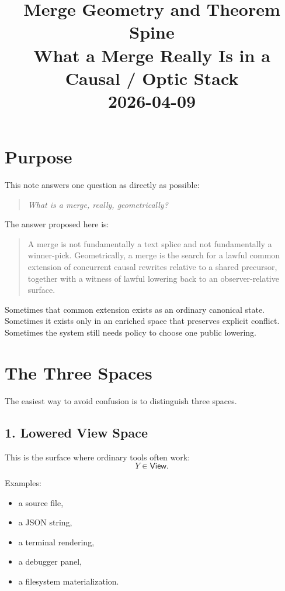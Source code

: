 \documentclass[11pt]{article}
\title{Merge Geometry and Theorem Spine\\[6pt]
\large What a Merge Really Is in a Causal / Optic Stack\\[3pt]
\normalsize 2026-04-09}
\author{}
\date{}
\newcommand{\View}{\ensuremath{\mathsf{View}}}
\theoremstyle{definition}
\begin{document}
\maketitle

\section{Purpose}

This note answers one question as directly as possible:

\begin{quote}
\emph{What is a merge, really, geometrically?}
\end{quote}

The answer proposed here is:

\begin{quote}
A merge is not fundamentally a text splice and not fundamentally a winner-pick.
Geometrically, a merge is the search for a lawful common extension of
concurrent causal rewrites relative to a shared precursor, together with a
witness of lawful lowering back to an observer-relative surface.
\end{quote}

Sometimes that common extension exists as an ordinary canonical state.
Sometimes it exists only in an enriched space that preserves explicit conflict.
Sometimes the system still needs policy to choose one public lowering.

\section{The Three Spaces}

The easiest way to avoid confusion is to distinguish three spaces.

\subsection{1. Lowered View Space}

This is the surface where ordinary tools often work:
\[
Y \in \View.
\]

Examples:
\begin{itemize}[leftmargin=2em]
\item a source file,
\item a JSON string,
\item a terminal rendering,
\item a debugger panel,
\item a filesystem materialization.
\end{itemize}
\end{document}
